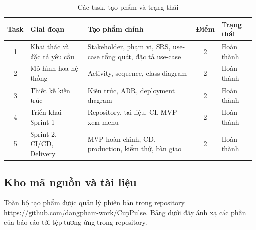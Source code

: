 \documentclass[a4paper]{article}
\newcommand{\thead}{\rowcolor{headgray}}
\begin{document}
\begin{table}[H]
\centering
\caption{Các task, tạo phẩm và trạng thái}
\begin{tabularx}{\textwidth}{|c|l|X|c|l|}
\hline
\thead \textbf{Task} & \textbf{Giai đoạn} & \textbf{Tạo phẩm chính} & \textbf{Điểm} & \textbf{Trạng thái} \\ \hline
1 & Khai thác và đặc tả yêu cầu & Stakeholder, phạm vi, SRS, use-case tổng quát, đặc tả use-case & 2 & Hoàn thành \\ \hline
2 & Mô hình hóa hệ thống & Activity, sequence, class diagram & 2 & Hoàn thành \\ \hline
3 & Thiết kế kiến trúc & Kiến trúc, ADR, deployment diagram & 2 & Hoàn thành \\ \hline
4 & Triển khai Sprint 1 & Repository, tài liệu, CI, MVP xem menu & 2 & Hoàn thành \\ \hline
5 & Sprint 2, CI/CD, Delivery & MVP hoàn chỉnh, CD, production, kiểm thử, bàn giao & 2 & Hoàn thành \\ \hline
\end{tabularx}
\end{table}

\subsection{Kho mã nguồn và tài liệu}
Toàn bộ tạo phẩm được quản lý phiên bản trong repository \url{https://github.com/dangpham-work/CupPulse}. Bảng dưới đây ánh xạ các phần của
báo cáo tới tệp tương ứng trong repository.
\end{document}
